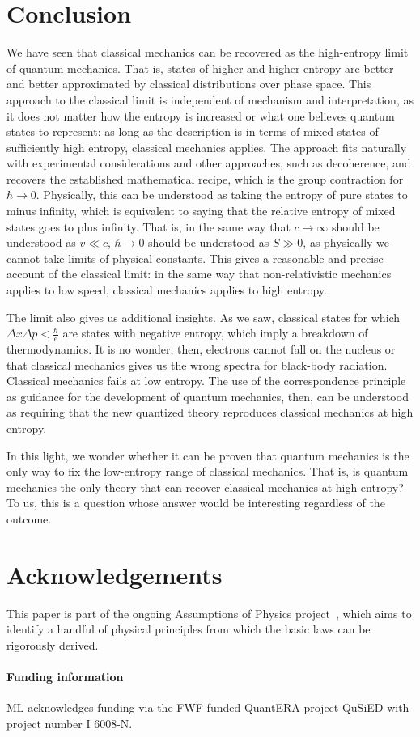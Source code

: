 \documentclass{article}
\begin{document}
\section{Conclusion}

We have seen that classical mechanics can be recovered as the high-entropy limit of quantum mechanics. That is, states of higher and higher entropy are better and better approximated by classical distributions over phase space. This approach to the classical limit is independent of mechanism and interpretation, as it does not matter how the entropy is increased or what one believes quantum states to represent: as long as the description is in terms of mixed states of sufficiently high entropy, classical mechanics applies. The approach fits naturally with experimental considerations and other approaches, such as decoherence, and recovers the established mathematical recipe, which is the group contraction for $\hbar \to 0$. Physically, this can be understood as taking the entropy of pure states to minus infinity, which is equivalent to saying that the relative entropy of mixed states goes to plus infinity. That is, in the same way that $c \to \infty$ should be understood as $v \ll c$, $\hbar \to 0$ should be understood as $S \gg 0$, as physically we cannot take limits of physical constants. This gives a reasonable and precise account of the classical limit: in the same way that non-relativistic mechanics applies to low speed, classical mechanics applies to high entropy.

The limit also gives us additional insights. As we saw, classical states for which $\Delta x \Delta p < \frac{\hbar}{e}$ are states with negative entropy, which imply a breakdown of thermodynamics. It is no wonder, then, electrons cannot fall on the nucleus or that classical mechanics gives us the wrong spectra for black-body radiation. Classical mechanics fails at low entropy. The use of the correspondence principle as guidance for the development of quantum mechanics, then, can be understood as requiring that the new quantized theory reproduces classical mechanics at high entropy. 

In this light, we wonder whether it can be proven that quantum mechanics is the only way to fix the low-entropy range of classical mechanics. That is, is quantum mechanics the only theory that can recover classical mechanics at high entropy? To us, this is a question whose answer would be interesting regardless of the outcome.

\section*{Acknowledgements}
This paper is part of the ongoing Assumptions of Physics project~\cite{aop-book}, which aims to identify a handful of physical principles from which the basic laws can be rigorously derived.

\paragraph{Funding information}
ML acknowledges funding via the FWF-funded QuantERA project QuSiED with project number I 6008-N.




\end{document}
